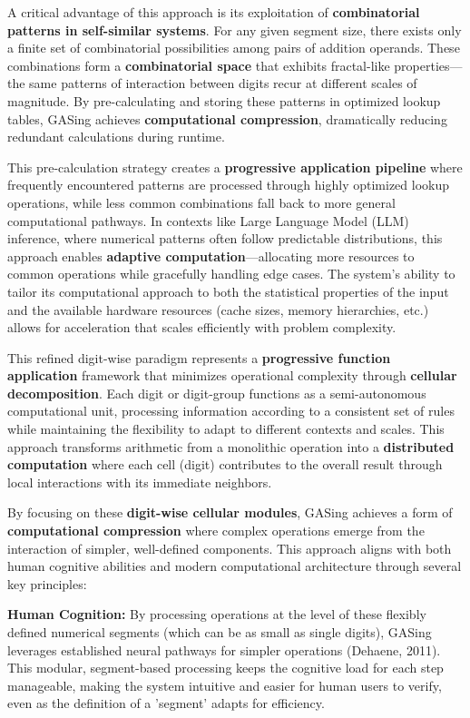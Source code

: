 A critical advantage of this approach is its exploitation of \textbf{combinatorial patterns in self-similar systems}. For any given segment size, there exists only a finite set of combinatorial possibilities among pairs of addition operands. These combinations form a \textbf{combinatorial space} that exhibits fractal-like properties—the same patterns of interaction between digits recur at different scales of magnitude. By pre-calculating and storing these patterns in optimized lookup tables, GASing achieves \textbf{computational compression}, dramatically reducing redundant calculations during runtime.

This pre-calculation strategy creates a \textbf{progressive application pipeline} where frequently encountered patterns are processed through highly optimized lookup operations, while less common combinations fall back to more general computational pathways. In contexts like Large Language Model (LLM) inference, where numerical patterns often follow predictable distributions, this approach enables \textbf{adaptive computation}—allocating more resources to common operations while gracefully handling edge cases. The system's ability to tailor its computational approach to both the statistical properties of the input and the available hardware resources (cache sizes, memory hierarchies, etc.) allows for acceleration that scales efficiently with problem complexity.

This refined digit-wise paradigm represents a \textbf{progressive function application} framework that minimizes operational complexity through \textbf{cellular decomposition}. Each digit or digit-group functions as a semi-autonomous computational unit, processing information according to a consistent set of rules while maintaining the flexibility to adapt to different contexts and scales. This approach transforms arithmetic from a monolithic operation into a \textbf{distributed computation} where each cell (digit) contributes to the overall result through local interactions with its immediate neighbors.

By focusing on these \textbf{digit-wise cellular modules}, GASing achieves a form of \textbf{computational compression} where complex operations emerge from the interaction of simpler, well-defined components. This approach aligns with both human cognitive abilities and modern computational architecture through several key principles:


\noindent\textbf{\textbf{Human Cognition}:} By processing operations at the level of these flexibly defined numerical segments (which can be as small as single digits), GASing leverages established neural pathways for simpler operations (Dehaene, 2011). This modular, segment-based processing keeps the cognitive load for each step manageable, making the system intuitive and easier for human users to verify, even as the definition of a 'segment' adapts for efficiency.


